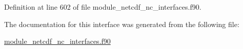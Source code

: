 Definition at line 602 of file module\+\_\+netcdf\+\_\+nc\+\_\+interfaces.\+f90.



The documentation for this interface was generated from the following file\+:\begin{DoxyCompactItemize}
\item 
\hyperlink{module__netcdf__nc__interfaces_8f90}{module\+\_\+netcdf\+\_\+nc\+\_\+interfaces.\+f90}\end{DoxyCompactItemize}
